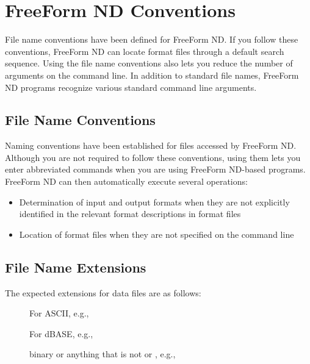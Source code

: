 %
%

\chapter{FreeForm ND Conventions}
\label{ff,convs}

File name conventions have been defined for FreeForm ND. If you follow
these conventions, FreeForm ND can locate format files through a
default search sequence. Using the file name conventions also lets you
reduce the number of arguments on the command line. In addition to
standard file names, FreeForm ND programs recognize various standard
command line arguments.

\section{File Name Conventions}
\label{ff,convs,filename}

Naming conventions have been established for files accessed by
FreeForm ND. Although you are not required to follow these
conventions, using them lets you enter abbreviated commands when you
are using FreeForm ND-based programs. FreeForm ND can then
automatically execute several operations:

\begin{itemize}
\item   Determination of input and output formats when they are not
  explicitly identified in the relevant format descriptions in format
  files
  
\item   Location of format files when they are not specified on the
  command line
\end{itemize}

\section{File Name Extensions}
\label{ff,convs,extension}

The expected extensions for data files are as follows: 

\begin{description}

\item[]  For ASCII, e.g., 

\item[] For dBASE, e.g., 

\item[] binary or anything that is not  or , e.g.,  
\end{description}

